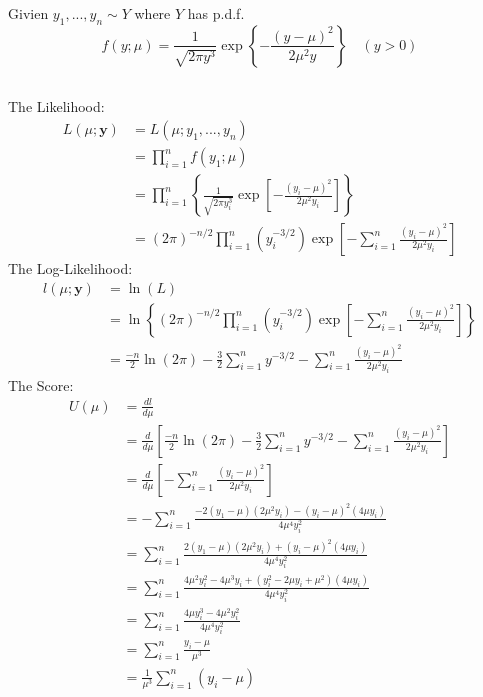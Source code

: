 \documentclass[a4paper]{article}
\begin{document}
	\newpage
	\section{}
		Givien \(y_1,...,y_n \sim Y\) where \(Y\) has p.d.f.
			\[f(y;\mu) = \frac{1}{\sqrt{2\pi y^3}}\exp\left\{-\frac{(y-\mu)^2}{2\mu^2y}\right\} \quad (y>0)\]
		
		\subsection{}
			The Likelihood:
				\begin{equation*}
					\begin{split}
						L(\mu;\mathbf{y}) &= L(\mu;y_1,...,y_n)\\
						&= \prod_{i=1}^n f(y_1;\mu)\\
						&= \prod_{i=1}^n \left\{\frac{1}{\sqrt{2\pi y_i^3}}\exp\left[-\frac{(y_i-\mu)^2}{2\mu^2y_i}\right]\right\}\\
						&= (2\pi)^{-n/2}\prod_{i=1}^n\left(y_i^{-3/2}\right) \exp \left[-\sum_{i=1}^n \frac{(y_i-\mu)^2}{2\mu^2y_i}\right]
					\end{split}
				\end{equation*}
			The Log-Likelihood:
				\begin{equation*}
					\begin{split}
						l(\mu;\mathbf{y}) &= \ln(L)\\
						&= \ln \left\{(2\pi)^{-n/2}\prod_{i=1}^n\left(y_i^{-3/2}\right) \exp \left[-\sum_{i=1}^n \frac{(y_i-\mu)^2}{2\mu^2y_i}\right]\right\}\\
						&= \frac{-n}{2}\ln(2\pi) - \frac{3}{2}\sum_{i=1}^n{y^{-3/2}} - \sum_{i=1}^n \frac{(y_i-\mu)^2}{2\mu^2y_i}
					\end{split}
				\end{equation*}
			The Score:
				\begin{equation*}
					\begin{split}
						U(\mu) &= \frac{dl}{d\mu}\\
						&= \frac{d}{d\mu} \left[\frac{-n}{2}\ln(2\pi) - \frac{3}{2}\sum_{i=1}^n{y^{-3/2}} - \sum_{i=1}^n \frac{(y_i-\mu)^2}{2\mu^2y_i}\right]\\
						&= \frac{d}{d\mu} \left[-\sum_{i=1}^n \frac{(y_i-\mu)^2}{2\mu^2y_i}\right]\\
						&= -\sum_{i=1}^n \frac{-2(y_1-\mu)(2\mu^2y_i) - (y_i-\mu)^2(4\mu y_i)}{4\mu^4y_i^2}\\
						&= \sum_{i=1}^n \frac{2(y_1-\mu)(2\mu^2y_i) + (y_i-\mu)^2(4\mu y_i)}{4\mu^4y_i^2}\\
						&= \sum_{i=1}^n \frac{4\mu^2y_i^2-4\mu^3y_i + (y_i^2 - 2\mu y_i + \mu^2)(4\mu y_i)}{4\mu^4y_i^2}\\
						&= \sum_{i=1}^n \frac{4\mu y_i^3-4\mu^2y_i^2}{4\mu^4y_i^2}\\
						&= \sum_{i=1}^n \frac{y_i-\mu}{\mu^3}\\
						&= \frac{1}{\mu^3} \sum_{i=1}^n \left(y_i -\mu\right)
					\end{split}
				\end{equation*}
\end{document}
